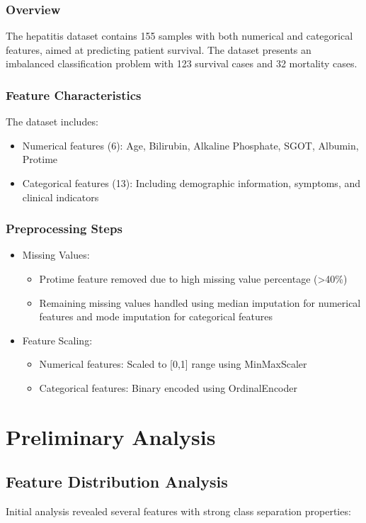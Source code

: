 \subsubsection{Overview}
The hepatitis dataset contains 155 samples with both numerical and categorical features, aimed at predicting patient survival. The dataset presents an imbalanced classification problem with 123 survival cases and 32 mortality cases.

\subsubsection{Feature Characteristics}
The dataset includes:
\begin{itemize}
    \item Numerical features (6): Age, Bilirubin, Alkaline Phosphate, SGOT, Albumin, Protime
    \item Categorical features (13): Including demographic information, symptoms, and clinical indicators
\end{itemize}

\subsubsection{Preprocessing Steps}
\begin{itemize}
    \item Missing Values:
    \begin{itemize}
        \item Protime feature removed due to high missing value percentage (>40\%)
        \item Remaining missing values handled using median imputation for numerical features and mode imputation for categorical features
    \end{itemize}
    \item Feature Scaling:
    \begin{itemize}
        \item Numerical features: Scaled to [0,1] range using MinMaxScaler
        \item Categorical features: Binary encoded using OrdinalEncoder
    \end{itemize}
\end{itemize}

\section{Preliminary Analysis}
\subsection{Feature Distribution Analysis}
Initial analysis revealed several features with strong class separation properties:

